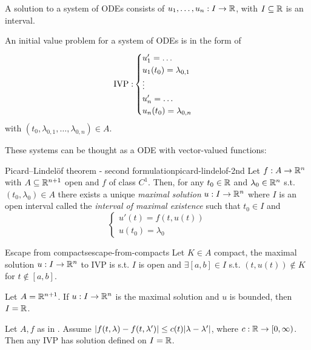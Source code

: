 \documentclass[12pt]{extarticle}
\begin{document}
A solution to a system of ODEs consists of $u_1, \dots, u_n: I \to \mathbb{R}$, with $I \subseteq \mathbb{R}$ is an interval.

An initial value problem for a system of ODEs is in the form of
\begin{equation}
    {\operatorfont IVP:}
    \begin{cases}
        u_1' = \ldots             \\
        u_1(t_0) = \lambda_{0, 1} \\
        \vdots                    \\
        u_n' = \ldots             \\
        u_n(t_0) = \lambda_{0, n} \\
    \end{cases}
\end{equation}
with $(t_0, \lambda_{0,1}, \dots, \lambda_{0,n}) \in A$.

These systems can be thought as a ODE with vector-valued functions:
\begin{theorem}{Picard–Lindelöf theorem - second formulation}{picard-lindelof-2nd}
    Let $f: A \to \mathbb{R}^n$ with $A \subseteq \mathbb{R}^{n+1}$ open and $f$ of class $C^1$.
    Then, for any $t_0 \in \mathbb{R}$ and $\lambda_0 \in \mathbb{R}^n$ s.t. $(t_0, \lambda_0) \in A$ there exists a unique \emph{maximal solution}
    $u: I \to \mathbb{R}^n$
    where $I$ is an open interval called the \emph{interval of maximal existence} such that $t_0 \in I$ and
    \begin{equation}
        \begin{cases}
            u'(t) = f(t, u(t)) \\
            u(t_0) = \lambda_0
        \end{cases}
    \end{equation}
\end{theorem}

\begin{theorem}{Escape from compacts}{escape-from-compacts}
    Let $K \in A$ compact, the maximal solution $u: I \to \mathbb{R}^n$ to IVP is s.t. $I$ is open and $\exists [a, b] \in I$ s.t. $(t, u(t)) \notin K$ for $t \notin [a, b]$.
\end{theorem}

\begin{corollary}{}{}
    Let $A = \mathbb{R}^{n+1}$. If $u: I \to \mathbb{R}^n$ is the maximal solution and $u$ is bounded, then $I = \mathbb{R}$.
\end{corollary}

\begin{theorem}{}{}
    Let $A, f$ as in .
    Assume $\abs{f(t, \lambda) - f(t, \lambda')} \leq c(t)\abs{\lambda - \lambda'}$, where $c: \mathbb{R} \to [0, \infty)$.
    Then any IVP has solution defined on $I = \mathbb{R}$.
\end{theorem}
\end{document}
